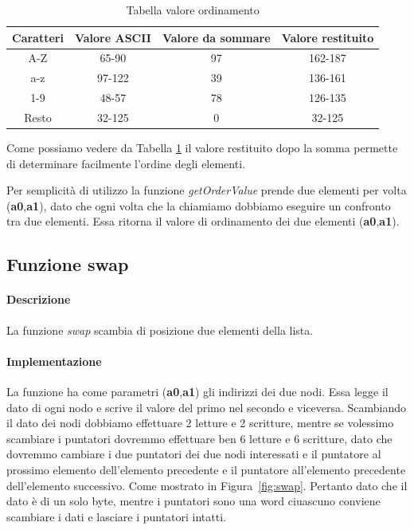 \begin{table}[H]
    \begin{center}
        \begin{tabular}{|c|c|c|c|}
            \hline
            Caratteri & Valore ASCII & Valore da sommare & Valore restituito \\
            \hline
            A-Z & 65-90 & 97 & 162-187 \\
            \hline
            a-z & 97-122 & 39 & 136-161 \\
            \hline
            1-9 & 48-57 & 78 & 126-135 \\
            \hline
            Resto & 32-125 & 0 & 32-125 \\
            \hline
        \end{tabular}
    \end{center}
    \caption{Tabella valore ordinamento}
    \label{tab:orderingValue}
\end{table}


Come possiamo vedere da Tabella \ref{tab:orderingValue} il valore restituito dopo la somma permette
di determinare facilmente l'ordine degli elementi.

Per semplicità di utilizzo la funzione \textit{getOrderValue} prende due elementi per volta (\textbf{a0},\textbf{a1}),
dato che ogni volta che la chiamiamo dobbiamo eseguire un confronto tra due elementi.
Essa ritorna il valore di ordinamento dei due elementi (\textbf{a0},\textbf{a1}). 

\subsection{Funzione swap}

\paragraph{Descrizione}
 La funzione \textit{swap} scambia di posizione due elementi della lista.
\paragraph{Implementazione} 
La funzione ha come parametri (\textbf{a0},\textbf{a1}) gli indirizzi dei due nodi.
Essa legge il dato di ogni nodo e scrive il valore del primo nel secondo e viceversa.
Scambiando il dato dei nodi dobbiamo effettuare 2 letture e 2 scritture, mentre se volessimo
scambiare i puntatori dovremmo effettuare ben 6 letture e 6 scritture, dato che dovremmo cambiare i due puntatori 
dei due nodi interessati e il puntatore al prossimo elemento dell'elemento precedente e il puntatore all'elemento precedente 
dell'elemento successivo. Come mostrato in Figura~\ref{fig:swap}. Pertanto dato che il dato è di un solo byte, mentre
i puntatori sono una word ciuascuno conviene scambiare i dati e lasciare i puntatori intatti.


